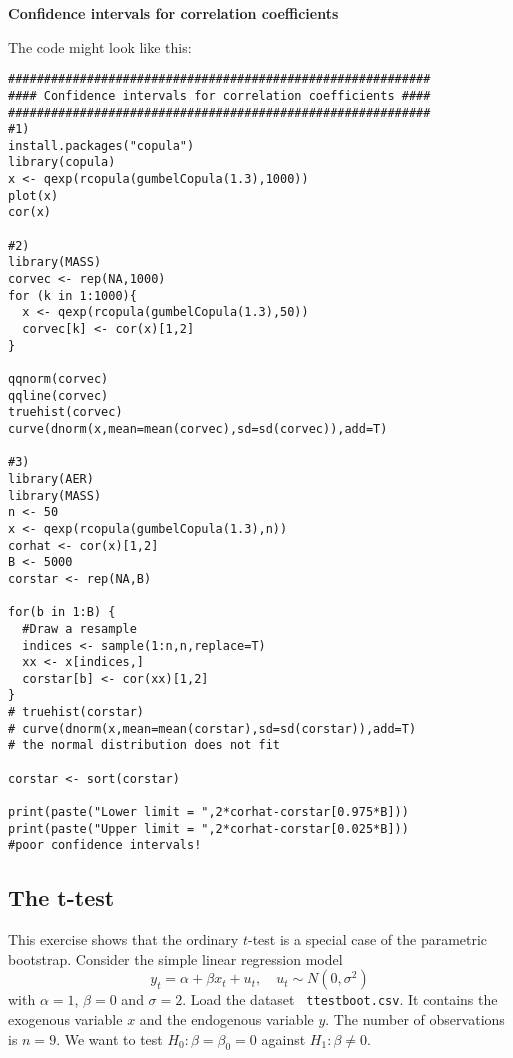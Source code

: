 \documentclass{article}
\begin{document}
\begin{solution}
\textbf{Confidence intervals for correlation coefficients }

The code might look like this:
\begin{verbatim}
###########################################################
#### Confidence intervals for correlation coefficients ####
###########################################################
#1)
install.packages("copula")
library(copula)
x <- qexp(rcopula(gumbelCopula(1.3),1000))
plot(x)
cor(x)

#2)
library(MASS)
corvec <- rep(NA,1000)
for (k in 1:1000){
  x <- qexp(rcopula(gumbelCopula(1.3),50))
  corvec[k] <- cor(x)[1,2]
}

qqnorm(corvec)
qqline(corvec)
truehist(corvec)
curve(dnorm(x,mean=mean(corvec),sd=sd(corvec)),add=T)

#3)
library(AER)
library(MASS)
n <- 50
x <- qexp(rcopula(gumbelCopula(1.3),n))
corhat <- cor(x)[1,2]
B <- 5000
corstar <- rep(NA,B)

for(b in 1:B) {
  #Draw a resample
  indices <- sample(1:n,n,replace=T)
  xx <- x[indices,]
  corstar[b] <- cor(xx)[1,2]
}
# truehist(corstar)
# curve(dnorm(x,mean=mean(corstar),sd=sd(corstar)),add=T)
# the normal distribution does not fit

corstar <- sort(corstar)

print(paste("Lower limit = ",2*corhat-corstar[0.975*B]))
print(paste("Upper limit = ",2*corhat-corstar[0.025*B]))
#poor confidence intervals!
\end{verbatim}
\end{solution}

\subsection{The t-test}

This exercise shows that the ordinary $t$-test is a special case of the
parametric bootstrap. Consider the simple linear regression model%
\begin{equation*}
y_{t}=\alpha +\beta x_{t}+u_{t},\quad u_{t}\sim N(0,\sigma ^{2})
\end{equation*}%
with $\alpha =1$, $\beta =0$ and $\sigma =2$. Load the dataset \texttt{%
ttestboot.csv}. It contains the exogenous variable $x$ and the endogenous
variable $y$. The number of observations is $n=9$. We want to test $%
H_{0}:\beta =\beta _{0}=0$ against $H_{1}:\beta \neq 0$.
\end{document}

